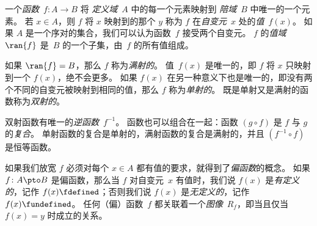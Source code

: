 一个\emph{函数}~$f\colon A \to B$ 将
\emph{定义域}~$A$ 中的每一个元素映射到
\emph{陪域}~$B$ 中唯一的一个元素。
若 $x \in A$，则 $f$ 将 $x$ 映射到的那个 $y$ 称为
$f$ 在\emph{自变元}~$x$ 处的\emph{值}~$f(x)$。
如果 $A$ 是一个序对的集合，我们可以认为函数~$f$ 接受两个自变元。
$f$ 的\emph{值域}~$\ran{f}$ 是~$B$ 的一个子集，由~$f$ 的所有值组成。

如果 $\ran{f} = B$，那么 $f$ 称为\emph{满射的}。
值~$f(x)$ 是唯一的，即 $f$ 将 $x$ 只映射到一个 $f(x)$，绝不会更多。
如果 $f(x)$ 在另一种意义下也是唯一的，即没有两个不同的自变元被映射到相同的值，那么 $f$ 称为\emph{单射的}。
既是单射又是满射的函数称为\emph{双射的}。

双射函数有唯一的\emph{逆函数}~$f^{-1}$。
函数也可以组合在一起：函数 $(g \circ f)$ 是 $f$ 与 $g$ 的\emph{复合}。
单射函数的复合是单射的，满射函数的复合是满射的，并且 $(f^{-1} \circ f)$ 是恒等函数。

如果我们放宽 $f$ 必须对每个 $x \in A$ 都有值的要求，就得到了\emph{偏函数}的概念。
如果 $f\colon A \pto B$ 是偏函数，那么当 $f$ 对自变元~$x$ 有值时，我们说 $f(x)$ 是\emph{有定义的}，记作 $f(x) \fdefined$；否则我们说 $f(x)$ 是\emph{无定义的}，记作 $f(x) \fundefined$。
任何（偏）函数~$f$ 都关联着一个\emph{图像}~$R_f$，即当且仅当 $f(x) = y$ 时成立的关系。